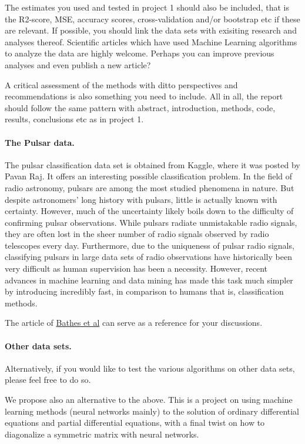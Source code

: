 \documentclass[%
oneside,                 %
final,                   %
10pt]{article}
\begin{document}
The estimates you used and tested in project 1 should also be
included, that is the R2-score, MSE, accuracy scores, cross-validation and/or bootstrap etc
if these are relevant.  If possible, you should link the data sets
with exisiting research and analyses thereof. Scientific articles
which have used Machine Learning algorithms to analyze the data are
highly welcome. Perhaps you can improve previous analyses and even
publish a new article?

A critical assessment of the methods with
ditto perspectives and recommendations is also something you need to
include.  All in all, the report should follow the same pattern with
abstract, introduction, methods, code, results, conclusions etc as in project 1.

\paragraph{The Pulsar data.}
The pulsar classification data set is obtained from
Kaggle, where it was posted by Pavan Raj. It offers an interesting
possible classification problem. In the field of radio astronomy,
pulsars are among the most studied phenomena in nature. But despite
astronomers' long history with pulsars, little is actually known with
certainty. However, much of the uncertainty likely boils down to the
difficulty of confirming pulsar observations. While pulsars radiate
unmistakable radio signals, they are often lost in the sheer number of
radio signals observed by radio telescopes every day. Furthermore, due
to the uniqueness of pulsar radio signals, classifying pulsars in
large data sets of radio observations have historically been very
difficult as human supervision has been a necessity. However, recent
advances in machine learning and data mining has made this task
much simpler by introducing incredibly fast, in comparison to humans
that is, classification methods.

The article of \href{{https://arxiv.org/abs/1209.0793}}{Bathes et al} can serve as a reference for your discussions.

\paragraph{Other data sets.}
Alternatively, if you would like to test the various algorithms on other data sets, please feel free to do so.

We propose also an alternative to the above. This is a project on using machine learning methods (neural networks mainly) to the solution of ordinary differential equations and partial differential equations, with a final twist on how to diagonalize a symmetric matrix with neural networks.
\end{document}
